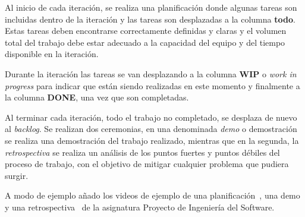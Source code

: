 Al inicio de cada iteración, se realiza una planificación donde algunas tareas son incluidas dentro de la iteración
y las tareas son desplazadas a la columna \textbf{todo}.
Estas tareas deben encontrarse correctamente definidas y claras y el volumen total del trabajo debe estar adecuado a
la capacidad del equipo y del tiempo disponible en la iteración.

Durante la iteración las tareas se van desplazando a la columna \textbf{WIP} o \textit{work in progress} para
indicar que están siendo realizadas en este momento y finalmente a la columna \textbf{DONE}, una vez que son
completadas.

Al terminar cada iteración, todo el trabajo no completado, se desplaza de nuevo al \textit{backlog}.
Se realizan dos ceremonias, en una denominada \textit{demo} o demostración se realiza una demostración del trabajo
realizado, mientras que en la segunda, la \textit{retrospectiva} se realiza un análisis de los puntos fuertes y
puntos débiles del proceso de trabajo, con el objetivo de mitigar cualquier problema que pudiera surgir.

A modo de ejemplo añado los videos de ejemplo de una planificación~\cite{url_viu_47_proyecto_ingenieria_sprint_6_plan},
una demo~\cite{url_viu_47_proyecto_ingenieria_sprint_6_demo} y una
retrospectiva~\cite{url_viu_47_proyecto_ingenieria_sprint_6_retrospectiva} de la asignatura Proyecto de Ingeniería del
Software.
